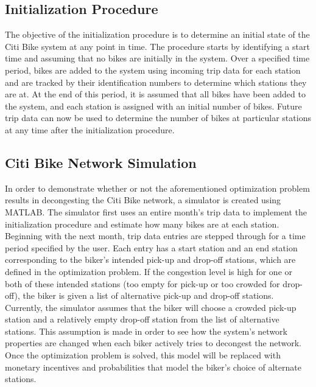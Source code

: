 \documentclass[times, 10pt,twocolumn]{article}
\begin{document}
\subsection{Initialization Procedure}
The objective of the initialization procedure is to determine an initial state of the Citi Bike system at any point in time. The procedure starts by identifying a start time and assuming that no bikes are initially in the system. Over a specified time period, bikes are added to the system using incoming trip data for each station and are tracked by their identification numbers to determine which stations they are at. At the end of this period, it is assumed that all bikes have been added to the system, and each station is assigned with an initial number of bikes. Future trip data can now be used to determine the number of bikes at particular stations at any time after the initialization procedure.

\subsection{Citi Bike Network Simulation}

In order to demonstrate whether or not the aforementioned optimization problem results in decongesting the Citi Bike network, a simulator is created using MATLAB. The simulator first uses an entire month's trip data to implement the initialization procedure and estimate how many bikes are at each station. Beginning with the next month, trip data entries are stepped through for a time period specified by the user. Each entry has a start station and an end station corresponding to the biker's intended pick-up and drop-off stations, which are defined in the optimization problem. If the congestion level is high for one or both of these intended stations (too empty for pick-up or too crowded for drop-off), the biker is given a list of alternative pick-up and drop-off stations. Currently, the simulator assumes that the biker will choose a crowded pick-up station and a relatively empty drop-off station from the list of alternative stations. This assumption is made in order to see how the system's network properties are changed when each biker actively tries to decongest the network. Once the optimization problem is solved, this model will be replaced with monetary incentives and probabilities that model the biker's choice of alternate stations.
\end{document}

